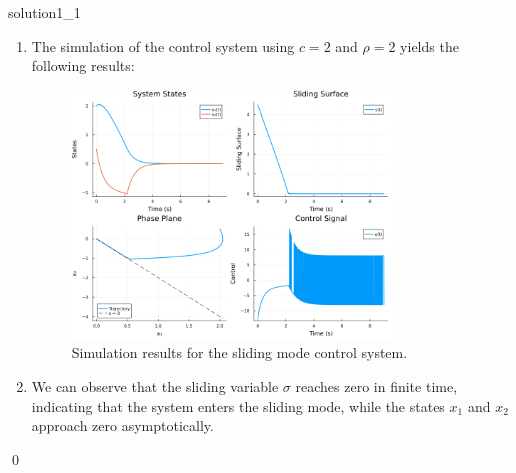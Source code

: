 \begin{solution}{}{solution1_1}
\begin{enumerate}[label=\textbf{\alph*)}]
		\item The simulation of the control system using $c=2$ and $\rho =2$ yields the following results:
		      \begin{figure}[H]
			      \centering
			      \includegraphics[width=0.8\textwidth]{img/problem1_1.png}
			      \caption{Simulation results for the sliding mode control system.}
			      \label{fig:problem1_1}
		      \end{figure}
        \item We can observe that the sliding variable \( \sigma \) reaches zero in finite time, indicating that the system enters the sliding mode, while the states \( x_1 \) and \( x_2 \) approach zero asymptotically. 

	\end{enumerate}
	\qed
\end{solution}